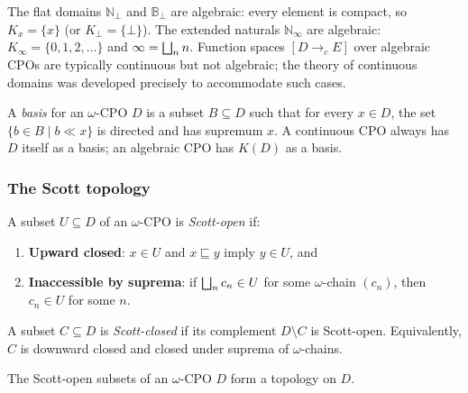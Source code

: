 \begin{example}
\label{ex:algebraic-cpo}
The flat domains $\mathbb{N}_\bot$ and $\mathbb{B}_\bot$ are algebraic:
every element is compact, so $K_x = \{x\}$ (or $K_\bot = \{\bot\}$).
The extended naturals $\mathbb{N}_\infty$ are algebraic:
$K_\infty = \{0, 1, 2, \ldots\}$ and $\infty = \bigsqcup_n n$.
Function spaces $[D \to_{c} E]$ over algebraic CPOs are typically
continuous but not algebraic; the theory of continuous domains was
developed precisely to accommodate such cases.
\end{example}

\begin{definition}[Basis]
\label{def:basis}
A \emph{basis} for an $\omega$-CPO $D$ is a subset $B \subseteq D$ such
that for every $x \in D$, the set $\{b \in B \mid b \ll x\}$ is directed
and has supremum $x$. A continuous CPO always has $D$ itself as a basis;
an algebraic CPO has $K(D)$ as a basis.
\end{definition}

\subsubsection*{The Scott topology}

\begin{definition}
\label{def:scott-topology}
A subset $U \subseteq D$ of an $\omega$-CPO is \emph{Scott-open} if:
\begin{enumerate}
  \item \textbf{Upward closed}: $x \in U$ and $x \sqsubseteq y$ imply
        $y \in U$, and
  \item \textbf{Inaccessible by suprema}: if $\bigsqcup_n c_n \in U$ for some
        $\omega$-chain $(c_n)$, then $c_n \in U$ for some $n$.
\end{enumerate}
A subset $C \subseteq D$ is \emph{Scott-closed} if its complement
$D \setminus C$ is Scott-open. Equivalently, $C$ is downward closed and
closed under suprema of $\omega$-chains.
\end{definition}

\begin{proposition}
\label{prop:scott-topology}
The Scott-open subsets of an $\omega$-CPO $D$ form a topology on $D$.
\end{proposition}

